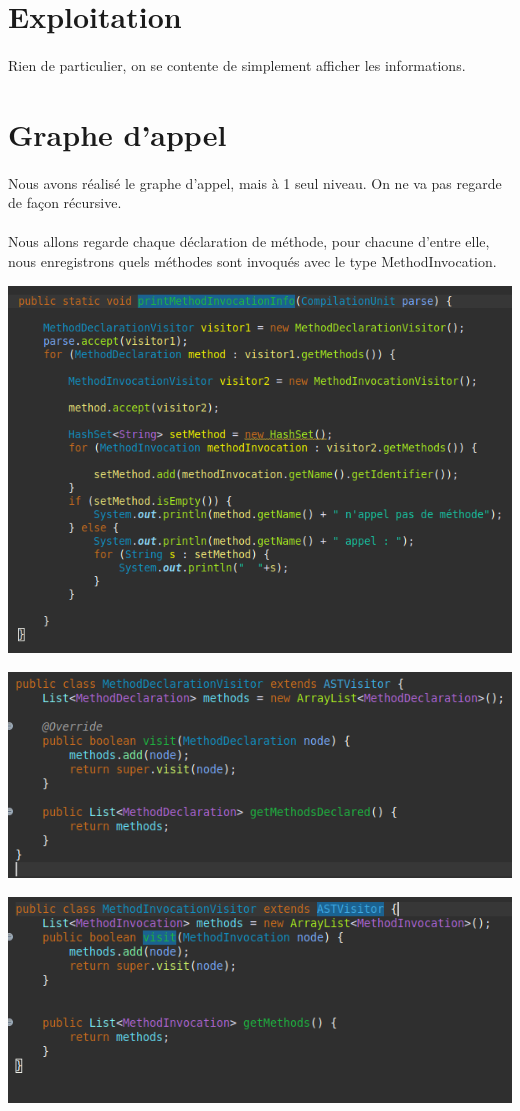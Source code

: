 \documentclass[a4paper]{article}
\begin{document}
\begin{multicols}{2}
        

        \section{Exploitation}
        \paragraph{} Rien de particulier, on se contente de simplement afficher les informations.

        \section{Graphe d'appel}
        \paragraph{} Nous avons réalisé le graphe d'appel, mais à 1 seul niveau. On ne va pas regarde de façon récursive.
        \paragraph{} Nous allons regarde chaque déclaration de méthode, pour chacune d'entre elle, nous enregistrons quels méthodes sont invoqués avec le type MethodInvocation.

        \noindent\includegraphics[width=.47\textwidth]{appel/print}

        \noindent\includegraphics[width=.47\textwidth]{appel/visitor1}

        \noindent\includegraphics[width=.47\textwidth]{appel/visitor2}






\end{multicols}
\end{document}
